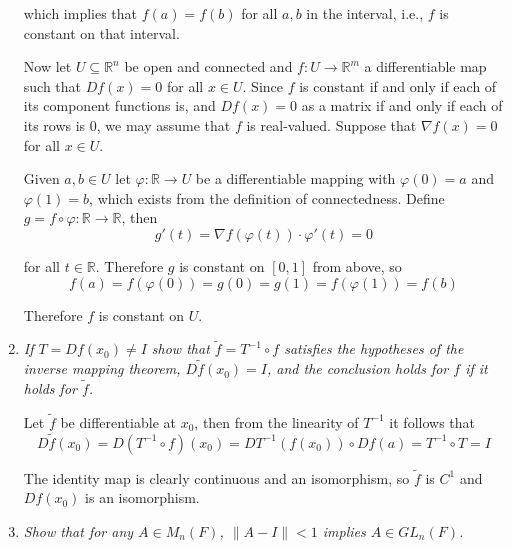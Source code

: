 \documentclass[11pt]{article}
\begin{document}
\begin{enumerate}
which implies that $f(a) = f(b)$ for all $a,b$ in the interval, i.e., $f$ is constant on that interval.

Now let $U \subseteq \mathbb{R}^n$ be open and connected and $f: U \rightarrow \mathbb{R}^m$ a differentiable map such that $Df(x) = 0$ for all $x \in U$.  Since $f$ is constant if and only if each of its component functions is, and $Df(x) = 0$ as a matrix if and only if each of its rows is $0$, we may assume that $f$ is real-valued.  Suppose that $\nabla f(x) = 0$ for all $x \in U$.

Given $a,b \in U$ let $\varphi: \mathbb{R} \rightarrow U$ be a differentiable mapping with $\varphi(0) = a$ and $\varphi(1)=b$, which exists from the definition of connectedness.  Define $g = f \circ \varphi: \mathbb{R} \rightarrow \mathbb{R}$, then
\[
g'(t) = \nabla f(\varphi(t)) \cdot \varphi'(t) = 0
\]

for all $t \in \mathbb{R}$.  Therefore $g$ is constant on $[0,1]$ from above, so
\[
f(a) = f(\varphi(0)) = g(0) = g(1) = f(\varphi(1)) = f(b)
\]

Therefore $f$ is constant on $U$.

\item \emph{If $T = Df(x_0) \neq I$ show that $\tilde{f} = T^{-1} \circ f$ satisfies the hypotheses of the inverse mapping theorem, $D\tilde{f}(x_0) = I$, and the conclusion holds for $f$ if it holds for $\tilde{f}$.}

Let $\tilde{f}$ be differentiable at $x_0$, then from the linearity of $T^{-1}$ it follows that 
\[
D\tilde{f}(x_0) = D(T^{-1} \circ f)(x_0) = DT^{-1}(f(x_0)) \circ Df(a) = T^{-1} \circ T = I
\]

The identity map is clearly continuous and an isomorphism, so $\tilde{f}$ is $C^1$ and $Df(x_0)$ is an isomorphism.

\item \emph{Show that for any $A \in M_n(F)$, $\|A - I\| < 1$ implies $A \in GL_n(F)$.}
\end{enumerate}
\end{document}
